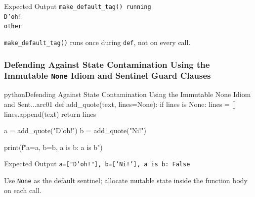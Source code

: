 \begin{iobox}{Expected Output}
\texttt{make\_default\_tag() running} \\
\texttt{D'oh!} \\
\texttt{other} \\
\end{iobox}




\texttt{make\_default\_tag()} runs once during \texttt{def}, not on every call.

\subsubsection{Defending Against State Contamination Using the Immutable \texttt{None} Idiom and Sentinel Guard Clauses}

\begin{codebox}[]{python}{Defending Against State Contamination Using the Immutable None Idiom and Sent...}{arc01}
def add_quote(text, lines=None):
    if lines is None:
        lines = []
    lines.append(text)
    return lines

a = add_quote("D'oh!")
b = add_quote("Ni!")

print(f"a={a}, b={b}, a is b: {a is b}")
\end{codebox}


\begin{iobox}{Expected Output}
\texttt{a=["D'oh!"], b=['Ni!'], a is b: False} \\
\end{iobox}




Use \texttt{None} as the default sentinel; allocate mutable state inside the function body on each call.
